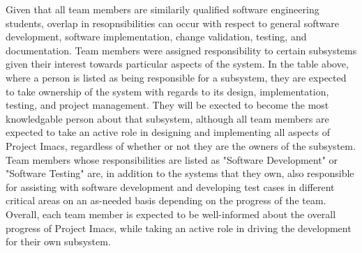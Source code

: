 \documentclass{article}
\begin{document}
Given that all team members are similarily qualified software engineering students, overlap in resopnsibilities can occur with respect to general software development, software implementation, change validation, testing, and documentation. Team members were assigned responsibility to certain subsystems given their interest towards particular aspects of the system. In the table above, where a person is listed as being responsible for a subsystem, they are expected to take ownership of the system with regards to its design, implementation, testing, and project management. They will be exected to become the most knowledgable person about that subsystem, although all team members are expected to take an active role in designing and implementing all aspects of Project Imacs, regardless of whether or not they are the owners of the subsystem. Team members whose responsibilities are listed as "Software Development" or "Software Testing" are, in addition to the systems that they own, also responsible for assisting with software development and developing test cases in different critical areas on an as-needed basis depending on the progress of the team. Overall, each team member is expected to be well-informed about the overall progress of Project Imacs, while taking an active role in driving the development for their own subsystem.
\end{document}
